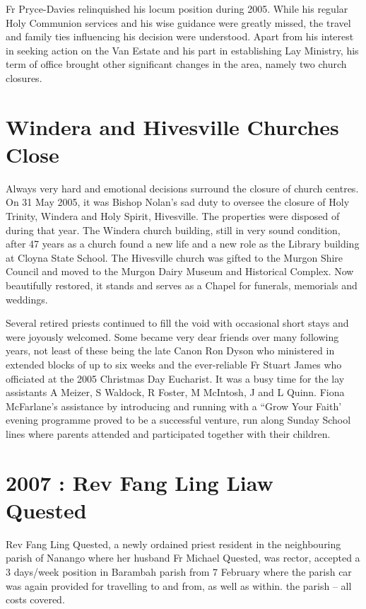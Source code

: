 Fr Pryce-Davies relinquished his locum position during 2005. While his regular Holy Communion services and his wise guidance were greatly missed, the travel and family ties influencing his decision were understood. Apart from his interest in seeking action on the Van Estate and his part in establishing Lay Ministry, his term of office brought other significant changes in the area, namely two church closures.

\hypertarget{windera-and-hivesville-churches-close}{%
\section{Windera and Hivesville Churches Close}\label{windera-and-hivesville-churches-close}}

Always very hard and emotional decisions surround the closure of church centres. On 31 May 2005, it was Bishop Nolan's sad duty to oversee the closure of Holy Trinity, Windera and Holy Spirit, Hivesville. The properties were disposed of during that year. The Windera church building, still in very sound condition, after 47 years as a church found a new life and a new role as the Library building at Cloyna State School. The Hivesville church was gifted to the Murgon Shire Council and moved to the Murgon Dairy Museum and Historical Complex. Now beautifully restored, it stands and serves as a Chapel for funerals, memorials and weddings.

Several retired priests continued to fill the void with occasional short stays and were joyously welcomed. Some became very dear friends over many following years, not least of these being the late Canon Ron Dyson who ministered in extended blocks of up to six weeks and the ever-reliable Fr Stuart James who officiated at the 2005 Christmas Day Eucharist. It was a busy time for the lay assistants A Meizer, S Waldock, R Foster, M McIntosh, J and L Quinn. Fiona McFarlane's assistance by introducing and running with a ``Grow Your Faith' evening programme proved to be a successful venture, run along Sunday School lines where parents attended and participated together with their children.

\hypertarget{rev-fang-ling-liaw-quested}{%
\section{2007 : Rev Fang Ling Liaw Quested}\label{rev-fang-ling-liaw-quested}}

Rev Fang Ling Quested, a newly ordained priest resident in the neighbouring parish of Nanango where her husband Fr Michael Quested, was rector, accepted a 3 days/week position in Barambah parish from 7 February where the parish car was again provided for travelling to and from, as well as within. the parish -- all costs covered.


